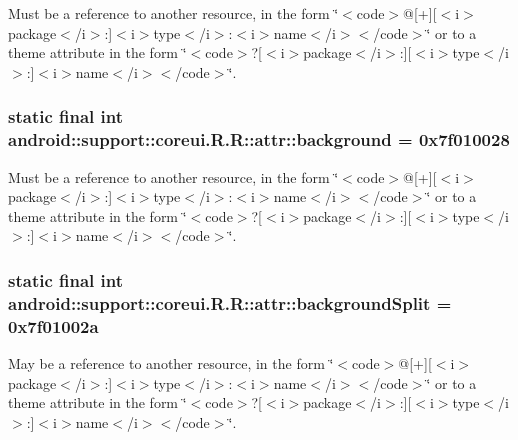 Must be a reference to another resource, in the form \char`\"{}$<$code$>$@\mbox{[}+\mbox{]}\mbox{[}$<$i$>$package$<$/i$>$:\mbox{]}$<$i$>$type$<$/i$>$:$<$i$>$name$<$/i$>$$<$/code$>$\char`\"{} or to a theme attribute in the form \char`\"{}$<$code$>$?\mbox{[}$<$i$>$package$<$/i$>$:\mbox{]}\mbox{[}$<$i$>$type$<$/i$>$:\mbox{]}$<$i$>$name$<$/i$>$$<$/code$>$\char`\"{}. \hypertarget{classandroid_1_1support_1_1coreui_1_1_r_1_1attr_819c383370c46744780beaaef014e9e2}{
\subsubsection[{background}]{\setlength{\rightskip}{0pt plus 5cm}static final int android::support::coreui.R.R::attr::background = 0x7f010028}}
\label{classandroid_1_1support_1_1coreui_1_1_r_1_1attr_819c383370c46744780beaaef014e9e2}


Must be a reference to another resource, in the form \char`\"{}$<$code$>$@\mbox{[}+\mbox{]}\mbox{[}$<$i$>$package$<$/i$>$:\mbox{]}$<$i$>$type$<$/i$>$:$<$i$>$name$<$/i$>$$<$/code$>$\char`\"{} or to a theme attribute in the form \char`\"{}$<$code$>$?\mbox{[}$<$i$>$package$<$/i$>$:\mbox{]}\mbox{[}$<$i$>$type$<$/i$>$:\mbox{]}$<$i$>$name$<$/i$>$$<$/code$>$\char`\"{}. \hypertarget{classandroid_1_1support_1_1coreui_1_1_r_1_1attr_dd7b04268f84abc74a8d753385533224}{
\subsubsection[{backgroundSplit}]{\setlength{\rightskip}{0pt plus 5cm}static final int android::support::coreui.R.R::attr::backgroundSplit = 0x7f01002a}}
\label{classandroid_1_1support_1_1coreui_1_1_r_1_1attr_dd7b04268f84abc74a8d753385533224}


May be a reference to another resource, in the form \char`\"{}$<$code$>$@\mbox{[}+\mbox{]}\mbox{[}$<$i$>$package$<$/i$>$:\mbox{]}$<$i$>$type$<$/i$>$:$<$i$>$name$<$/i$>$$<$/code$>$\char`\"{} or to a theme attribute in the form \char`\"{}$<$code$>$?\mbox{[}$<$i$>$package$<$/i$>$:\mbox{]}\mbox{[}$<$i$>$type$<$/i$>$:\mbox{]}$<$i$>$name$<$/i$>$$<$/code$>$\char`\"{}. 

